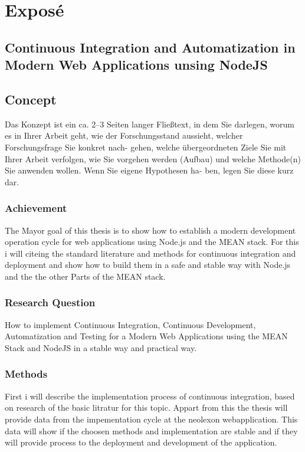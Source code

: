 \section{Exposé}

\subsection{Continuous Integration and Automatization in Modern Web Applications unsing NodeJS}


\subsection{Concept}
Das Konzept ist ein ca. 2–3 Seiten langer Fließtext, in dem Sie darlegen, worum es in Ihrer Arbeit geht, wie der Forschungsstand aussieht, welcher Forschungsfrage Sie konkret nach- gehen, welche übergeordneten Ziele Sie mit Ihrer Arbeit verfolgen, wie Sie vorgehen werden (Aufbau) und welche Methode(n) Sie anwenden wollen. Wenn Sie eigene Hypothesen ha- ben, legen Sie diese kurz dar.

\subsubsection{Achievement}
The Mayor goal of this thesis is to show how to establish a modern development operation cycle for
web applications using Node.js and the MEAN stack. For this i will citeing the standard literature and methods for continuous
integration and deployment and show how to build them in a safe and stable way with Node.js and the
the other Parts of the MEAN stack.

\subsubsection{Research Question}
How to implement Continuous Integration, Continuous Development, Automatization and Testing for a Modern Web Applications
using the MEAN Stack and NodeJS in a stable way and practical way.

\subsubsection{Methods}
First i will describe the implementation process of continuous integration, based on research of the basic litratur for this
topic. Appart from this the thesis will provide data from the impementation cycle at the neolexon webapplication.
This data will show if the choosen methods and implementation are stable and if they will provide process to the deployment
and development of the application.

